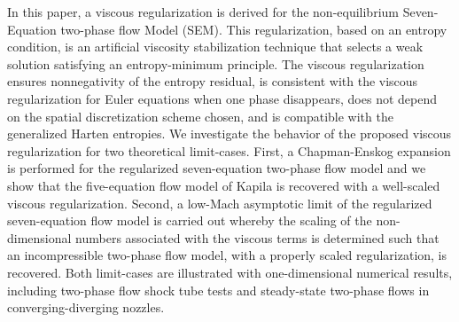 In this paper, a viscous regularization is derived for the non-equilibrium Seven-Equation two-phase flow Model (SEM). 
This regularization, based on an entropy condition, is an artificial viscosity stabilization technique
that selects a weak solution satisfying an entropy-minimum principle.
The viscous regularization ensures nonnegativity of the entropy residual,
is consistent with the viscous regularization for Euler equations when one phase disappears, 
does not depend on the spatial discretization scheme chosen, 
and is compatible with the generalized Harten entropies. 
%
We investigate the behavior of the proposed viscous regularization for two theoretical 
  limit-cases. 
First, a Chapman-Enskog expansion is performed for the regularized seven-equation two-phase flow model and 
we show that the five-equation flow  model of Kapila is recovered with a well-scaled viscous regularization. 
Second, a low-Mach asymptotic limit of the regularized seven-equation flow model is carried out whereby the 
scaling of the non-dimensional numbers associated with the viscous terms is determined such that an 
incompressible two-phase flow model, with a properly scaled regularization, is recovered. 
%
Both limit-cases are illustrated with one-dimensional numerical results, including two-phase flow shock tube tests 
and steady-state two-phase flows in converging-diverging nozzles.